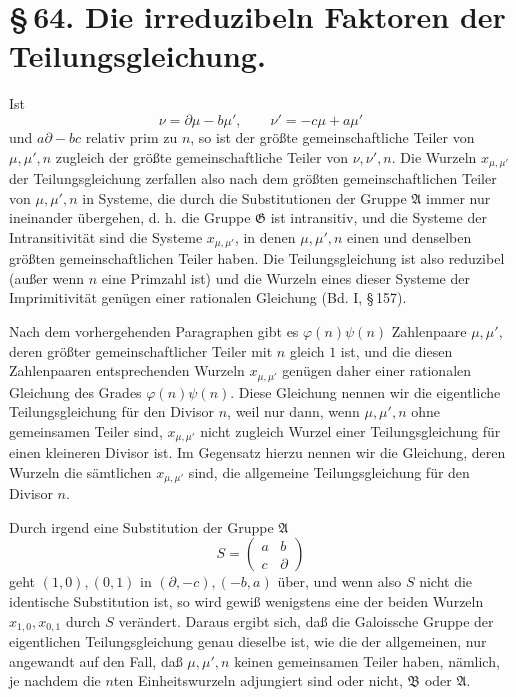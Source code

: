 \documentclass[11pt]{article}
\begin{document}
\section*{\S\,64. Die irreduzibeln Faktoren der Teilungsgleichung.}

Ist
\[
 \nu=\partial\mu-b\mu',
 \qquad
 \nu'=-c\mu+a\mu'
\]
und $a\partial-bc$ relativ prim zu $n$, so ist der größte gemeinschaftliche Teiler von
$\mu,\mu',n$ zugleich der größte gemeinschaftliche Teiler von $\nu,\nu',n$. Die Wurzeln
$x_{\mu,\mu'}$ der Teilungsgleichung zerfallen also nach dem größten gemeinschaftlichen
Teiler von $\mu,\mu',n$ in Systeme, die durch die Substitutionen der Gruppe $\mathfrak A$
immer nur ineinander übergehen, d. h. die Gruppe $\mathfrak G$ ist intransitiv, und die
Systeme der Intransitivität sind die Systeme $x_{\mu,\mu'}$, in denen $\mu,\mu',n$ einen
und denselben größten gemeinschaftlichen Teiler haben. Die Teilungsgleichung ist also
reduzibel (außer wenn $n$ eine Primzahl ist) und die Wurzeln eines dieser Systeme der
Imprimitivität genügen einer rationalen Gleichung (Bd. I, \S\,157).

Nach dem vorhergehenden Paragraphen gibt es $\varphi(n)\psi(n)$ Zahlenpaare
$\mu,\mu'$, deren größter gemeinschaftlicher Teiler mit $n$ gleich $1$ ist, und die diesen
Zahlenpaaren entsprechenden Wurzeln $x_{\mu,\mu'}$ genügen daher einer rationalen
Gleichung des Grades $\varphi(n)\psi(n)$. Diese Gleichung nennen wir die eigentliche
Teilungsgleichung für den Divisor $n$, weil nur dann, wenn $\mu,\mu',n$ ohne gemeinsamen
Teiler sind, $x_{\mu,\mu'}$ nicht zugleich Wurzel einer Teilungsgleichung für einen kleineren
Divisor ist. Im Gegensatz hierzu nennen wir die Gleichung, deren Wurzeln die sämtlichen
$x_{\mu,\mu'}$ sind, die allgemeine Teilungsgleichung für den Divisor $n$.

Durch irgend eine Substitution der Gruppe $\mathfrak A$
\[
 S=\begin{pmatrix}a&b\\c&\partial\end{pmatrix}
\]
geht $(1,0),(0,1)$ in $(\partial,-c),(-b,a)$ über, und wenn also $S$ nicht die identische
Substitution ist, so wird gewiß wenigstens eine der beiden Wurzeln $x_{1,0},x_{0,1}$ durch
$S$ verändert. Daraus ergibt sich, daß die Galoissche Gruppe der eigentlichen
Teilungsgleichung genau dieselbe ist, wie die der allgemeinen, nur angewandt auf den
Fall, daß $\mu,\mu',n$ keinen gemeinsamen Teiler haben, nämlich, je nachdem die $n$ten
Einheitswurzeln adjungiert sind oder nicht, $\mathfrak B$ oder $\mathfrak A$.
\end{document}
